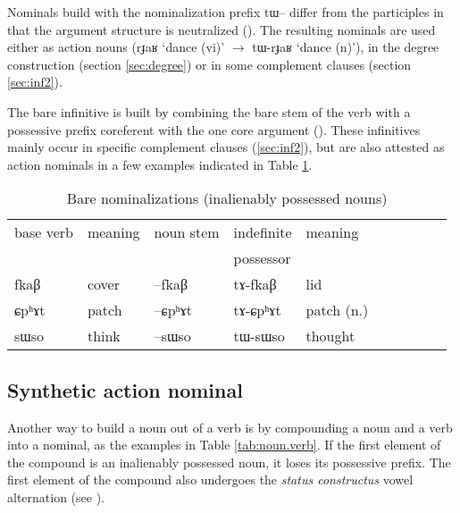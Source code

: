 \documentclass[oldfontcommands,oneside,a4paper,11pt]{article}
\newcommand{\ipa}[1]{{\phon #1}} %
\begin{document}
Nominals build with the nominalization prefix \ipa{tɯ--} differ from the participles in that the argument structure is neutralized (\citealt[6-7]{jacques14antipassive}). The resulting nominals are used either as action nouns (\ipa{rɟaʁ} `dance (vi)' $\rightarrow$ \ipa{tɯ-rɟaʁ} `dance (n)'), in the degree construction (section \ref{sec:degree}) or in some complement clauses (section \ref{sec:inf2}).

The bare infinitive is built by combining the bare stem of the verb with a possessive prefix coreferent with the one core argument (\citealt[6-7]{jacques14antipassive}). These infinitives mainly occur in specific complement clauses (\ref{sec:inf2}), but are also attested as action nominals  in a few examples indicated in Table \ref{tab:nmlz-inalienably}.


\begin{table}[H]
\caption{Bare nominalizations (inalienably possessed nouns)} \label{tab:nmlz-inalienably} \centering
\begin{tabular}{llllllllll}
\toprule
base verb & meaning & noun stem & indefinite  & meaning\\
&&&possessor\\
\midrule
\ipa{fkaβ} & cover& \ipa{--fkaβ} & \ipa{tɤ-fkaβ} & lid\\
\ipa{ɕpʰɤt} & patch& \ipa{--ɕpʰɤt} & \ipa{tɤ-ɕpʰɤt} & patch (n.) \\
\ipa{sɯso} & think & \ipa{--sɯso} & \ipa{tɯ-sɯso} & thought \\
\bottomrule
\end{tabular}
\end{table}



\subsection{Synthetic action nominal}
Another way to build a noun out of a verb is by compounding a noun and a verb into a nominal, as the examples in Table \ref{tab:noun.verb}. If the first element of the compound is an inalienably possessed noun, it loses its possessive prefix. The first element of the compound also undergoes the \textit{status constructus} vowel alternation (see \citealt{jacques12incorp}).
\end{document}
